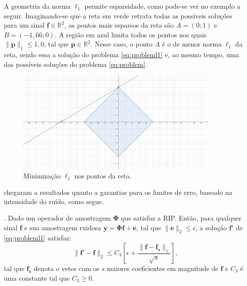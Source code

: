 \documentclass[cic,tc]{iiufrgs}
\renewcommand{\vec}[1]{\bm{#1}}
\begin{document}
A geometria da norma $\ell_1$ permite esparsidade, como pode-se ver no exemplo a seguir. Imaginando-se 
que a reta em verde retrata todas as possíveis soluções para um sinal $\vec{f} \in \mathbb{R}^2$, os pontos
mais esparsos da reta são $A=(0;1)$ e $B=(-1,66;0)$. A região em azul limita todos os pontos 
nos quais $\lVert\vec{p}\rVert_1 \le 1,0$, tal que $\vec{p} \in \mathbb{R}^2$. Nesse caso, o ponto $A$ é o 
de menor norma $\ell_1$ da reta, sendo essa a solução do problema \eqref{eq:probleml1} e, ao mesmo tempo, 
uma das possíveis soluções do problema \eqref{eq:problem}.
\begin{figure}[h]
    \caption{Minimização $\ell_1$ nos pontos da reta.}
    \begin{center}
        \includegraphics[width=0.9\textwidth]{img/l1ball}
    \end{center}
    \label{fig:l1ball}
\end{figure}

\citet{candes2006stable} chegaram a resultados quanto a garantias para os limites de erro, baseado na 
intensidade do ruído, como segue.
\begin{teorema}
    \cite{candes2006stable}. 
    Dado um operador de amostragem $\mathbf{\Phi}$ que satisfaz a RIP.
    Então, para qualquer sinal $\vec{f}$ e sua amostragem ruidosa $\vec{y} = \mathbf{\Phi}\vec{f} + \vec{e}$, 
    tal que $\lVert \vec{e} \rVert_2 \le \epsilon$, a solução $\vec{f}'$ de \eqref{eq:probleml1} satisfaz:
    \begin{equation*}
        \lVert \vec{f}' - \vec{f} \rVert_2 \le C_3 \left[ \epsilon + \frac{\lVert \vec{f} - \vec{f_s} \rVert_1}{\sqrt{s}} \right],
    \end{equation*}
    tal que $\vec{f_s}$ denota o vetor com os $s$ maiores coeficientes em magnitude de $\vec{f}$ e $C_3$ é uma
    constante tal que $C_3 \ge 0$.
\end{teorema}
\end{document}
